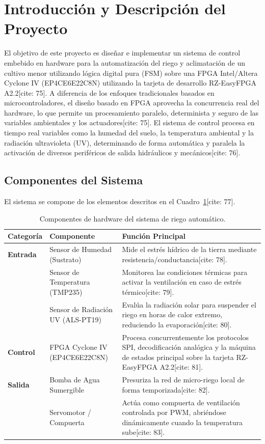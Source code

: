 \section{Introducción y Descripción del Proyecto}

El objetivo de este proyecto es diseñar e implementar un sistema de control embebido en hardware para la automatización del riego y aclimatación de un cultivo menor utilizando lógica digital pura (FSM) sobre una FPGA Intel/Altera Cyclone IV (EP4CE6E22C8N) utilizando la tarjeta de desarrollo RZ-EasyFPGA A2.2[cite: 75]. A diferencia de los enfoques tradicionales basados en microcontroladores, el diseño basado en FPGA aprovecha la concurrencia real del hardware, lo que permite un procesamiento paralelo, determinista y seguro de las variables ambientales y los actuadores[cite: 75]. El sistema de control procesa en tiempo real variables como la humedad del suelo, la temperatura ambiental y la radiación ultravioleta (UV), determinando de forma automática y paralela la activación de diversos periféricos de salida hidráulicos y mecánicos[cite: 76].

\subsection{Componentes del Sistema}
El sistema se compone de los elementos descritos en el Cuadro~\ref{tab:componentes_sistema}[cite: 77].

\begin{table}[H]
	\centering
	\caption{Componentes de hardware del sistema de riego automático.}
	\label{tab:componentes_sistema}
	\renewcommand{\arraystretch}{1.3}
	\begin{tabular}{@{} l p{5cm} p{8cm} @{}}
		\toprule
		\textbf{Categoría} & \textbf{Componente} & \textbf{Función Principal} \\
		\midrule
		\textbf{Entrada} & Sensor de Humedad (Sustrato) & Mide el estrés hídrico de la tierra mediante resistencia/conductancia[cite: 78]. \\
		& Sensor de Temperatura (TMP235) & Monitorea las condiciones térmicas para activar la ventilación en caso de estrés térmico[cite: 79]. \\
		& Sensor de Radiación UV (ALS-PT19) & Evalúa la radiación solar para suspender el riego en horas de calor extremo, reduciendo la evaporación[cite: 80]. \\
		\midrule
		\textbf{Control} & FPGA Cyclone IV (EP4CE6E22C8N) & Procesa concurrentemente los protocolos SPI, decodificación analógica y la máquina de estados principal sobre la tarjeta RZ-EasyFPGA A2.2[cite: 81]. \\
		\midrule
		\textbf{Salida} & Bomba de Agua Sumergible & Presuriza la red de micro-riego local de forma temporizada[cite: 82]. \\
		& Servomotor / Compuerta & Actúa como compuerta de ventilación controlada por PWM, abriéndose dinámicamente cuando la temperatura sube[cite: 83]. \\
		\bottomrule
	\end{tabular}
\end{table}